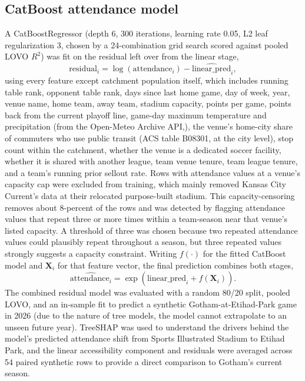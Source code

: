 \documentclass[9pt,twoside]{pnas-new}
\begin{document}
\subsection{CatBoost attendance model}
A CatBoostRegressor (depth 6, 300 iterations, learning rate 0.05, L2 leaf regularization 3, chosen by a 24-combination grid search scored against pooled LOVO $R^2$) was fit on the residual left over from the linear stage, \begin{equation}
\text{residual}_i = \log(\text{attendance}_i) - \widehat{\text{linear\_pred}}_i
\label{eq:residual},
\end{equation} using every feature except catchment population itself, which includes running table rank, opponent table rank, days since last home game, day of week, year, venue name, home team, away team, stadium capacity, points per game, points back from the current playoff line, game-day maximum temperature and precipitation (from the Open-Meteo Archive API,), the venue's home-city share of commuters who use public transit (ACS table B08301, at the city level), stop count within the catchment, whether the venue is a dedicated soccer facility, whether it is shared with another league, team venue tenure, team league tenure, and a team's running prior sellout rate. Rows with attendance values at a venue's capacity cap were excluded from training, which mainly removed Kansas City Current's data at their relocated purpose-built stadium. This capacity-censoring removes about 8-percent of the rows and was detected by flagging attendance values that repeat three or more times within a team-season near that venue's listed capacity. A threshold of three was chosen because two repeated attendance values could plausibly repeat throughout a season, but three repeated values strongly suggests a capacity constraint. Writing $f(\cdot)$ for the fitted CatBoost model and $\mathbf{X}_i$ for that feature vector, the final prediction combines both stages,
\begin{equation}
\widehat{\text{attendance}_i} = \exp\!\left(\widehat{\text{linear\_pred}}_i + f(\mathbf{X}_i)\right).
\label{eq:combined}
\end{equation} The combined residual model was evaluated with a random 80/20 split, pooled LOVO, and an in-sample fit to predict a synthetic Gotham-at-Etihad-Park game in 2026 (due to the nature of tree models, the model cannot extrapolate to an unseen future year). TreeSHAP was used to understand the drivers behind the model's predicted attendance shift from Sports Illustrated Stadium to Etihad Park, and the linear accessibility component and residuals were averaged across 54 paired synthetic rows to provide a direct comparison to Gotham's current season.
\end{document}
